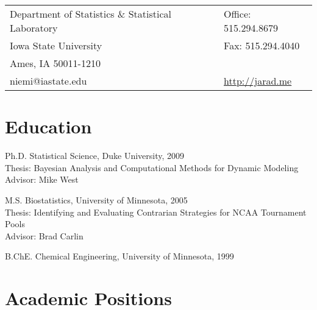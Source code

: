 \documentclass[overlapped,line]{res}
\begin{document}

\setlength{\leftmargini}{0em}
\renewcommand{\labelitemi}{}

\renewcommand{\namefont}{\large\textbf}



\begin{resume}

\begin{tabular}{ll}
  Department of Statistics \& Statistical Laboratory    & Office: 515.294.8679 \\
  Iowa State University                   &  Fax: \hspace{.07in} 515.294.4040 \\
  Ames, IA 50011-1210        & \\
  niemi@iastate.edu  & \url{http://jarad.me}
\end{tabular}




\section{\bf Education}
Ph.D. Statistical Science, Duke University, 2009 \\%
Thesis: Bayesian Analysis and Computational Methods for Dynamic Modeling\\
Advisor: Mike West

M.S. Biostatistics, University of Minnesota, 2005\\%
Thesis: Identifying and Evaluating Contrarian Strategies for NCAA Tournament Pools \\
Advisor: Brad Carlin

B.ChE. Chemical Engineering, University of Minnesota, 1999%



\section{\bf Academic Positions}


\end{resume}
\end{document}
